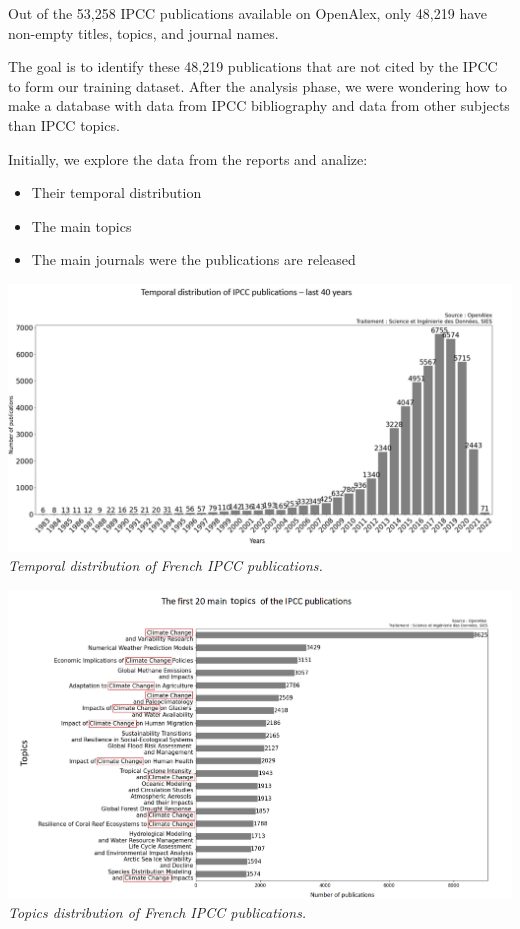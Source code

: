 \documentclass[
]{article}
\providecommand{\tightlist}{%
  \setlength{\itemsep}{0pt}\setlength{\parskip}{0pt}}
\begin{document}
Out of the 53,258 IPCC publications available on OpenAlex, only 48,219
have non-empty titles, topics, and journal names.

The goal is to identify these 48,219 publications that are not cited by
the IPCC to form our training dataset. After the analysis phase, we were
wondering how to make a database with data from IPCC bibliography and
data from other subjects than IPCC topics.

Initially, we explore the data from the reports and analize:

\begin{itemize}
\tightlist
\item
  Their temporal distribution
\item
  The main topics
\item
  The main journals were the publications are released
\end{itemize}

\includegraphics{./images/time_distribution_IPCC_model.png}
\emph{Temporal distribution of French IPCC publications.}

\includegraphics{./images/topics_distribution_IPCC_model.png}
\emph{Topics distribution of French IPCC publications.}
\end{document}
